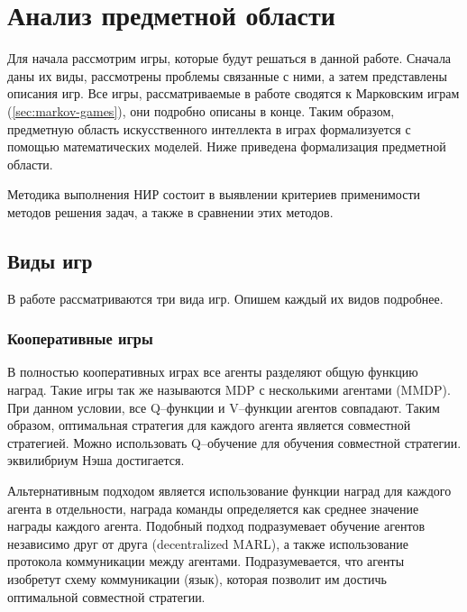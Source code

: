 \chapter{Анализ предметной области}

Для начала рассмотрим игры, которые будут решаться в данной работе. Сначала даны их виды, рассмотрены проблемы связанные с ними, а затем представлены описания игр.
Все игры, рассматриваемые в работе сводятся к Марковским играм (\ref{sec:markov-games}), они подробно описаны в конце.
Таким образом, предметную область искусственного интеллекта в играх формализуется с помощью математических моделей. 
Ниже приведена формализация предметной области.

Методика выполнения НИР состоит в выявлении критериев применимости методов решения задач, а также в сравнении этих методов.


\section{Виды игр}

В работе рассматриваются три вида игр. Опишем каждый их видов подробнее.

\subsection{Кооперативные игры}

В полностью кооперативных играх все агенты разделяют общую функцию наград. Такие игры так же называются MDP с несколькими агентами \newline (MMDP).
При данном условии, все Q--функции и V--функции агентов совпадают. Таким образом, оптимальная стратегия для каждого агента является совместной стратегией.
Можно использовать Q--обучение для обучения совместной стратегии. эквилибриум Нэша достигается.

Альтернативным подходом является использование функции наград для каждого агента в отдельности, награда команды определяется как среднее значение награды каждого агента.
Подобный подход подразумевает обучение агентов независимо друг от друга (decentralized MARL), а также использование протокола коммуникации между агентами.
Подразумевается, что агенты изобретут схему коммуникации (язык), которая позволит им достичь оптимальной совместной стратегии.

